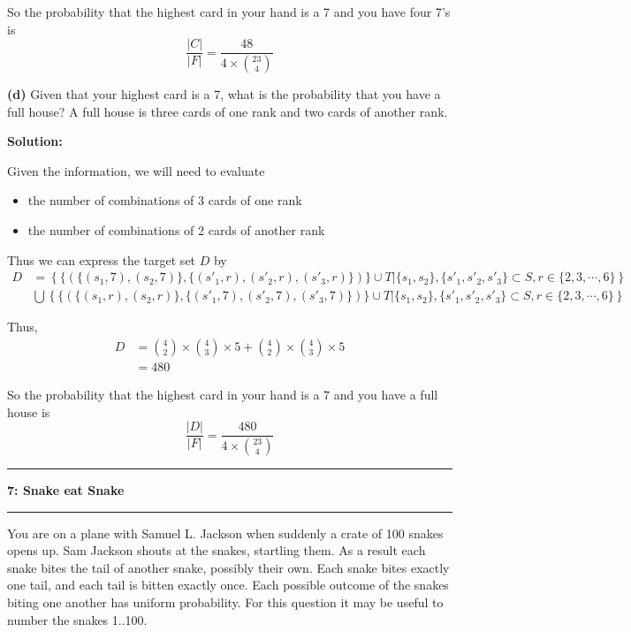 \documentclass[11pt]{article}
\newcommand\question[2]{\vspace{.25in}\hrule\textbf{#1: #2}\vspace{.5em}\hrule\vspace{.10in}}
\renewcommand\part[1]{\vspace{.10in}\textbf{(#1)}}
\newcommand{\solution}{\vspace{.10in}\textbf{Solution: }}
\begin{document}
So the probability that the highest card in your hand is a $7$ and you have four 7's is
\begin{equation*}
  \frac{|C|}{|F|} = \frac{48}{4\times \binom{23}{4}}
\end{equation*}

\part{d}
Given that your highest card is a 7, what is the probability that you have a full house? A full house is three cards of one rank and two cards of another rank.

\solution

Given the information, we will need to evaluate
\begin{itemize}
  \item the number of combinations of 3 cards of one rank
  \item the number of combinations of 2 cards of another rank
\end{itemize}

Thus we can express the target set $D$ by
\begin{align*}
  D &= \left\{\{(\{(s_1,7),(s_2,7)\},\{(s'_1,r),(s'_2,r),(s'_3,r)\})\}\cup T|  \{s_1, s_2\}, \{s'_1, s'_2, s'_3\}\subset S, r\in \{2,3,\cdots, 6\} \right\} \\
    &\bigcup \left\{\{(\{(s_1,r),(s_2,r)\},\{(s'_1,7),(s'_2,7),(s'_3,7)\})\}\cup T| \{s_1, s_2\}, \{s'_1, s'_2, s'_3\}\subset S, r\in \{2,3,\cdots, 6\} \right\}
\end{align*}

Thus,
\begin{align*}
  D &= \binom{4}{2}\times \binom{4}{3}\times 5 + \binom{4}{2}\times \binom{4}{3}\times 5 \\
    &= 480
\end{align*}

So the probability that the highest card in your hand is a $7$ and you have a full house is
\begin{equation*}
  \frac{|D|}{|F|} = \frac{480}{4\times \binom{23}{4}}
\end{equation*}

\question{7}{Snake eat Snake}
You are on a plane with Samuel L. Jackson when suddenly a crate of 100 snakes opens up. Sam Jackson shouts at the snakes, startling them. As a result each snake bites the tail of another snake, possibly their own. Each snake bites exactly one tail, and each tail is bitten exactly once. Each possible outcome of the snakes biting one another has uniform probability. For this question it may be useful to number the snakes 1..100.
\end{document}
